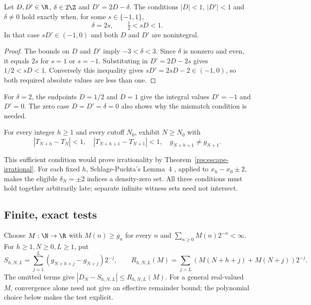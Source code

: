 \documentclass[11pt]{article}
\begin{document}
\begin{proposition}\label{res:signedwindow}
Let $D,D'\in\R$, $\delta\in2\Z$ and $D'=2D-\delta$.
The conditions $|D|<1$, $|D'|<1$ and $\delta\ne0$ hold exactly when,
for some $s\in\{-1,1\}$,
\[
 \delta=2s,\qquad \tfrac12<sD<1.
\]
In that case $sD'\in(-1,0)$ and both $D$ and $D'$ are nonintegral.
\end{proposition}
\begin{proof}
The bounds on $D$ and $D'$ imply $-3<\delta<3$.  Since $\delta$ is
nonzero and even, it equals $2s$ for $s=1$ or $s=-1$.  Substituting in
$D'=2D-2s$ gives $1/2<sD<1$.  Conversely this inequality gives
$sD'=2sD-2\in(-1,0)$, so both required absolute values are less than one.
\end{proof}
For $\delta=2$, the endpoints $D=1/2$ and $D=1$ give the integral
values $D'=-1$ and $D'=0$.  The zero case $D=D'=\delta=0$ also shows
why the mismatch condition is needed.

\begin{problem}\label{prob:smallpair}
For every integer $h\ge1$ and every cutoff $N_0$, exhibit $N\ge N_0$ with
\begin{equation}\label{eq:smallpair}
 |T_{N+h}-T_N|<1,\quad |T_{N+h+1}-T_{N+1}|<1,\quad
 g_{N+h+1}\ne g_{N+1}.
\end{equation}
\end{problem}
This sufficient condition would prove irrationality by
Theorem~\ref{res:escape-irrational}.  For each fixed $h$,
Schlage-Puchta's Lemma~4 \cite{schlagepuchta2011}, applied to
$x_h-x_0\pm2$, makes the eligible $\delta_N=\pm2$ indices a density-zero
set.  All three conditions must hold together arbitrarily late;
separate infinite witness sets need not intersect.

\subsection{Finite, exact tests}
Choose $M:\N\to\R$ with $M(n)\ge g_n$ for every $n$ and
$\sum_{n\ge0}M(n)2^{-n}<\infty$.  For $h\ge1,N\ge0,L\ge1$, put
\[
 S_{h,N,L}=\sum_{j=1}^{L}(g_{N+h+j}-g_{N+j})2^{-j},\qquad
 R_{h,N,L}(M)=\sum_{j>L}(M(N+h+j)+M(N+j))2^{-j}.
\]
The omitted terms give $|D_N-S_{h,N,L}|\le R_{h,N,L}(M)$.
For a general real-valued $M$, convergence alone need not give an effective
remainder bound; the polynomial choice below makes the test explicit.
\end{document}
